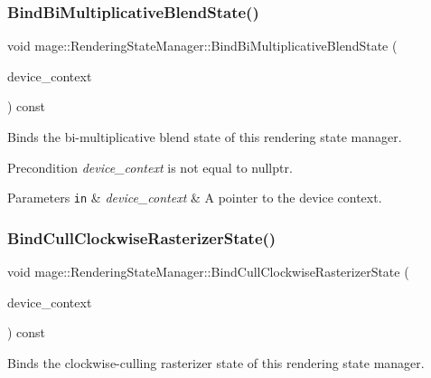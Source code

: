\subsubsection{\texorpdfstring{Bind\+Bi\+Multiplicative\+Blend\+State()}{BindBiMultiplicativeBlendState()}}
{\footnotesize\ttfamily void mage\+::\+Rendering\+State\+Manager\+::\+Bind\+Bi\+Multiplicative\+Blend\+State (\begin{DoxyParamCaption}\item[{I\+D3\+D11\+Device\+Context2 $\ast$}]{device\+\_\+context }\end{DoxyParamCaption}) const\hspace{0.3cm}{\ttfamily [noexcept]}}

Binds the bi-\/multiplicative blend state of this rendering state manager.

\begin{DoxyPrecond}{Precondition}
{\itshape device\+\_\+context} is not equal to {\ttfamily nullptr}. 
\end{DoxyPrecond}

\begin{DoxyParams}[1]{Parameters}
\mbox{\tt in}  & {\em device\+\_\+context} & A pointer to the device context. \\
\hline
\end{DoxyParams}
\hypertarget{classmage_1_1_rendering_state_manager_ae51ba156f6e55d905fd15f755c465032}{}\label{classmage_1_1_rendering_state_manager_ae51ba156f6e55d905fd15f755c465032} 
\subsubsection{\texorpdfstring{Bind\+Cull\+Clockwise\+Rasterizer\+State()}{BindCullClockwiseRasterizerState()}}
{\footnotesize\ttfamily void mage\+::\+Rendering\+State\+Manager\+::\+Bind\+Cull\+Clockwise\+Rasterizer\+State (\begin{DoxyParamCaption}\item[{I\+D3\+D11\+Device\+Context2 $\ast$}]{device\+\_\+context }\end{DoxyParamCaption}) const\hspace{0.3cm}{\ttfamily [noexcept]}}

Binds the clockwise-\/culling rasterizer state of this rendering state manager.

